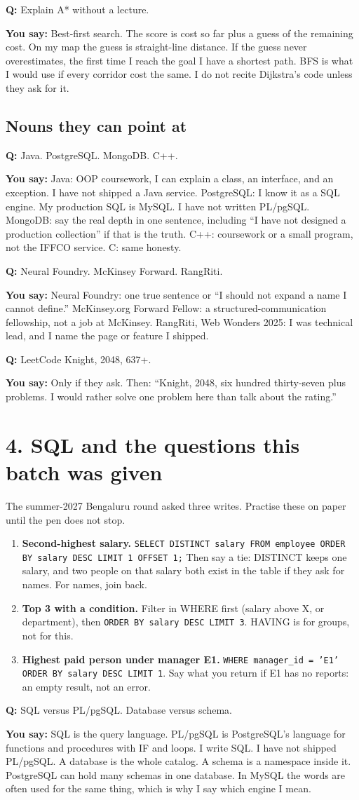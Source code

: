 \documentclass[a4paper,9.5pt]{extarticle}
\newcommand{\Q}[1]{\par\vspace{1.5pt}\noindent\textcolor{hot}{\textbf{Q:} #1}\par}
\newcommand{\Say}[1]{\noindent\textcolor{ok}{\textbf{You say:} #1}\par}
\begin{document}
\Q{Explain A* without a lecture.}
\Say{Best-first search. The score is cost so far plus a guess of the remaining cost. On my map the guess is straight-line distance. If the guess never overestimates, the first time I reach the goal I have a shortest path. BFS is what I would use if every corridor cost the same. I do not recite Dijkstra's code unless they ask for it.}

\subsection{Nouns they can point at}
\Q{Java. PostgreSQL. MongoDB. C++.}
\Say{Java: OOP coursework, I can explain a class, an interface, and an exception. I have not shipped a Java service. PostgreSQL: I know it as a SQL engine. My production SQL is MySQL. I have not written PL/pgSQL. MongoDB: say the real depth in one sentence, including ``I have not designed a production collection'' if that is the truth. C++: coursework or a small program, not the IFFCO service. C: same honesty.}

\Q{Neural Foundry. McKinsey Forward. RangRiti.}
\Say{Neural Foundry: one true sentence or ``I should not expand a name I cannot define.'' McKinsey.org Forward Fellow: a structured-communication fellowship, not a job at McKinsey. RangRiti, Web Wonders 2025: I was technical lead, and I name the page or feature I shipped.}

\Q{LeetCode Knight, 2048, 637+.}
\Say{Only if they ask. Then: ``Knight, 2048, six hundred thirty-seven plus problems. I would rather solve one problem here than talk about the rating.''}

\section{4. SQL and the questions this batch was given}
The summer-2027 Bengaluru round asked three writes. Practise these on paper until the pen does not stop.
\begin{enumerate}[leftmargin=1.3em, itemsep=2pt]
  \item \textbf{Second-highest salary.} \texttt{SELECT DISTINCT salary FROM employee ORDER BY salary DESC LIMIT 1 OFFSET 1;} Then say a tie: DISTINCT keeps one salary, and two people on that salary both exist in the table if they ask for names. For names, join back.
  \item \textbf{Top 3 with a condition.} Filter in WHERE first (salary above X, or department), then \texttt{ORDER BY salary DESC LIMIT 3}. HAVING is for groups, not for this.
  \item \textbf{Highest paid person under manager E1.} \texttt{WHERE manager\_id = 'E1' ORDER BY salary DESC LIMIT 1}. Say what you return if E1 has no reports: an empty result, not an error.
\end{enumerate}
\Q{SQL versus PL/pgSQL. Database versus schema.}
\Say{SQL is the query language. PL/pgSQL is PostgreSQL's language for functions and procedures with IF and loops. I write SQL. I have not shipped PL/pgSQL. A database is the whole catalog. A schema is a namespace inside it. PostgreSQL can hold many schemas in one database. In MySQL the words are often used for the same thing, which is why I say which engine I mean.}
\end{document}

